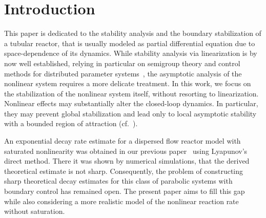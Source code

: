 \documentclass{mpi2015-cscpreprint}
\numberwithin{equation}{section}
\begin{document}

\maketitle


\section{Introduction}\label{sec:intro}

This paper is dedicated to the stability analysis and the boundary stabilization of a tubular reactor, that is usually modeled as partial differential equation due to space-dependence of its dynamics. {While stability analysis via linearization is by now well established, relying in particular on semigroup theory and control methods for distributed parameter systems~\cite{HasWinDoc2020,WinDocLig2000}, the asymptotic analysis of the nonlinear system requires a more delicate treatment. In this work, we focus on the stabilization of the nonlinear system itself, without resorting to linearization. Nonlinear effects may substantially alter the closed-loop dynamics. In particular, they may prevent global stabilization and lead only to local asymptotic stability with a bounded region of attraction (cf.~\cite{lhachemi2023local}).}

An exponential decay rate estimate for a dispersed flow reactor model with saturated nonlinearity was obtained in our previous paper~\cite{YevZB2025} using Lyapunov's direct method. There it was shown by numerical simulations, that the derived theoretical estimate is not sharp. Consequently, the problem of constructing sharp theoretical decay estimates for this class of parabolic systems with boundary control has remained open. The present paper aims to fill this gap while also considering a more realistic model of the nonlinear reaction rate without saturation.
\end{document}
